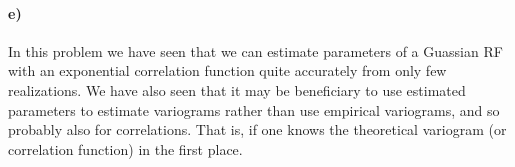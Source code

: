 \paragraph{e)}
In this problem we have seen that we can estimate parameters of a Guassian RF with an exponential correlation function quite accurately from only few realizations. We have also seen that it may be beneficiary to use estimated parameters to estimate variograms rather than use empirical variograms, and so probably also for correlations. That is, if one knows the theoretical variogram (or correlation function) in the first place.
